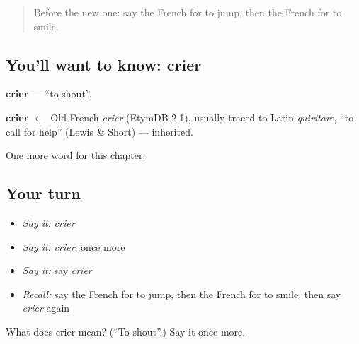 \begin{quote}
Before the new one: say the French for to jump, then the French for to smile.
\end{quote}

\subsection*{You'll want to know: crier}
\textbf{crier} — \textquotedblleft{}to shout\textquotedblright{}.

\begin{cousinweb}
\textbf{crier} $\leftarrow$ Old French \emph{crier} (EtymDB 2.1), usually traced to Latin \emph{quiritare}, \textquotedblleft{}to call for help\textquotedblright{} (Lewis \& Short) — inherited.
\end{cousinweb}

\begin{grammarlens}[title={What you've built}]
One more word for this chapter.
\end{grammarlens}

\subsection*{Your turn}
\begin{itemize}
\raggedright
  \item \emph{Say it:} \emph{crier}
  \item \emph{Say it:} \emph{crier}, once more
  \item \emph{Say it:} say \emph{crier}
  \item \emph{Recall:} say the French for to jump, then the French for to smile, then say \emph{crier} again
\end{itemize}

\begin{tcolorbox}[breakable,colback=teal!4,colframe=teal!35!black,title={Before you move on}]
What does crier mean? (\textquotedblleft{}To shout\textquotedblright{}.) Say it once more.
\end{tcolorbox}
